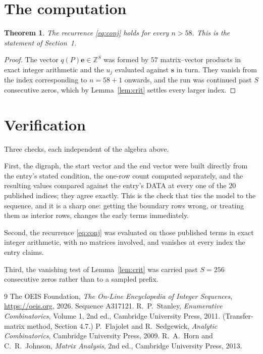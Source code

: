 \documentclass[11pt,a4paper]{article}
\theoremstyle{plain}
\newtheorem{theorem}{Theorem}
\theoremstyle{definition}
\begin{document}
\section{The computation}

\begin{theorem}
The recurrence \eqref{eq:conj} holds for every $n>58$. This is the statement of
Section~1.
\end{theorem}

\begin{proof}
The vector $q(P)\mathbf{e}\in\mathbb{Z}^{S}$ was formed by $57$ matrix--vector
products in exact integer arithmetic and the $u_j$ evaluated against $\mathbf{s}$ in turn.
They vanish from the index corresponding to $n=58+1$ onwards, and the run was continued
past $S$ consecutive zeros, which by Lemma~\ref{lem:crit} settles every larger index.
\end{proof}

\section{Verification}

Three checks, each independent of the algebra above.

First, the digraph, the start vector and the end vector were built directly from the
entry's stated condition, the one-row count computed separately, and the resulting values
compared against the entry's DATA at every one of the $20$ published indices; they
agree exactly. This is the check that ties the model to the sequence, and it is a sharp one:
getting the boundary rows wrong, or treating them as interior rows, changes the early terms
immediately.

Second, the recurrence \eqref{eq:conj} was evaluated on those published terms in exact
integer arithmetic, with no matrices involved, and vanishes at every index the entry claims.

Third, the vanishing test of Lemma~\ref{lem:crit} was carried past $S=256$ consecutive
zeros rather than to a sampled prefix.

\begin{thebibliography}{9}
 The OEIS Foundation, \emph{The On-Line Encyclopedia of Integer
Sequences}, \url{https://oeis.org}, 2026. Sequence A317121.
 R.~P.~Stanley, \emph{Enumerative Combinatorics}, Volume 1, 2nd ed.,
Cambridge University Press, 2011. (Transfer-matrix method, Section 4.7.)
 P.~Flajolet and R.~Sedgewick, \emph{Analytic Combinatorics}, Cambridge
University Press, 2009.
 R.~A.~Horn and C.~R.~Johnson, \emph{Matrix Analysis}, 2nd ed., Cambridge
University Press, 2013.
\end{thebibliography}
\end{document}
